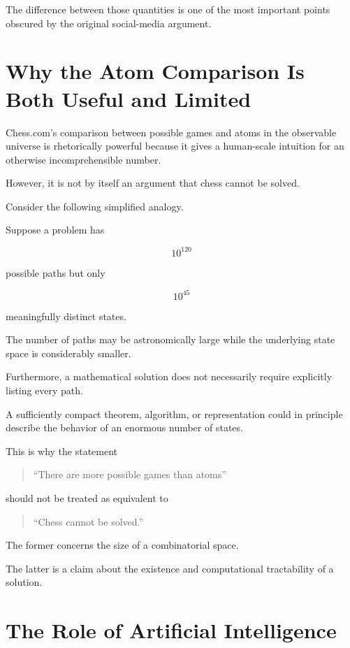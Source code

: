 \documentclass[12pt,a4paper]{article}
\begin{document}
The difference between those quantities is one of the most important
points obscured by the original social-media argument.


\section{Why the Atom Comparison Is Both Useful and Limited}

Chess.com's comparison between possible games and atoms in the
observable universe is rhetorically powerful because it gives a
human-scale intuition for an otherwise incomprehensible number.

However, it is not by itself an argument that chess cannot be solved.

Consider the following simplified analogy.

Suppose a problem has

\[
10^{120}
\]

possible paths but only

\[
10^{45}
\]

meaningfully distinct states.

The number of paths may be astronomically large while the underlying
state space is considerably smaller.

Furthermore, a mathematical solution does not necessarily require
explicitly listing every path.

A sufficiently compact theorem, algorithm, or representation could
in principle describe the behavior of an enormous number of states.

This is why the statement

\begin{quote}
    ``There are more possible games than atoms''
\end{quote}

should not be treated as equivalent to

\begin{quote}
    ``Chess cannot be solved.''
\end{quote}

The former concerns the size of a combinatorial space.

The latter is a claim about the existence and computational
tractability of a solution.


\section{The Role of Artificial Intelligence}
\end{document}

